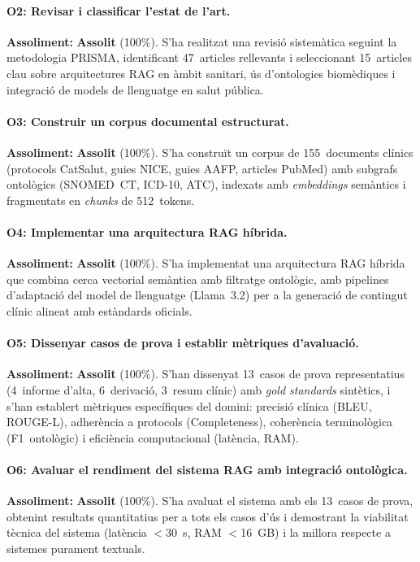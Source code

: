 \documentclass[CAT]{TFUOC}%
\begin{document}
\paragraph{O2: Revisar i classificar l'estat de l'art.}
\textbf{Assoliment:} \textbf{Assolit} (100\%). S'ha realitzat una revisió sistemàtica seguint la metodologia PRISMA, identificant 47~articles rellevants i seleccionant 15~articles clau sobre arquitectures RAG en àmbit sanitari, ús d'ontologies biomèdiques i integració de models de llenguatge en salut pública.

\paragraph{O3: Construir un corpus documental estructurat.}
\textbf{Assoliment:} \textbf{Assolit} (100\%). S'ha construït un corpus de 155~documents clínics (protocols CatSalut, guies NICE, guies AAFP, articles PubMed) amb subgrafs ontològics (SNOMED~CT, ICD-10, ATC), indexats amb \textit{embeddings} semàntics i fragmentats en \textit{chunks} de 512~tokens.

\paragraph{O4: Implementar una arquitectura RAG híbrida.}
\textbf{Assoliment:} \textbf{Assolit} (100\%). S'ha implementat una arquitectura RAG híbrida que combina cerca vectorial semàntica amb filtratge ontològic, amb pipelines d'adaptació del model de llenguatge (Llama~3.2) per a la generació de contingut clínic alineat amb estàndards oficials.

\paragraph{O5: Dissenyar casos de prova i establir mètriques d'avaluació.}
\textbf{Assoliment:} \textbf{Assolit} (100\%). S'han dissenyat 13~casos de prova representatius (4~informe d'alta, 6~derivació, 3~resum clínic) amb \textit{gold standards} sintètics, i s'han establert mètriques específiques del domini: precisió clínica (BLEU, ROUGE-L), adherència a protocols (Completeness), coherència terminològica (F1~ontològic) i eficiència computacional (latència, RAM).

\paragraph{O6: Avaluar el rendiment del sistema RAG amb integració ontològica.}
\textbf{Assoliment:} \textbf{Assolit} (100\%). S'ha avaluat el sistema amb els 13~casos de prova, obtenint resultats quantitatius per a tots els casos d'ús i demostrant la viabilitat tècnica del sistema (latència $<$30~s, RAM $<$16~GB) i la millora respecte a sistemes purament textuals.
\end{document}
